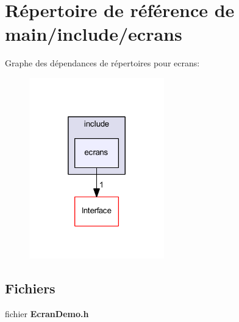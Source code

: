 \section{Répertoire de référence de main/include/ecrans}
\label{dir_33dd75604c629413030978b04091fea9}
Graphe des dépendances de répertoires pour ecrans\+:\nopagebreak
\begin{figure}[H]
\begin{center}
\leavevmode
\includegraphics[width=166pt]{dir_33dd75604c629413030978b04091fea9_dep}
\end{center}
\end{figure}
\subsection*{Fichiers}
\begin{DoxyCompactItemize}
\item 
fichier {\bf Ecran\+Demo.\+h}
\end{DoxyCompactItemize}
